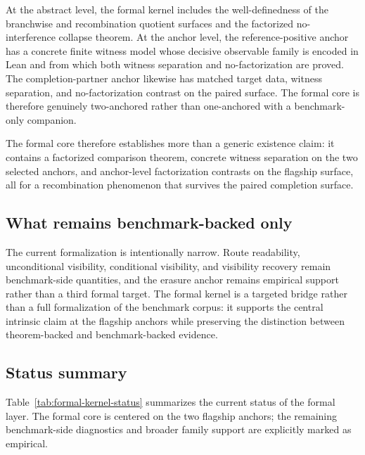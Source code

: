 \documentclass[11pt]{article}
\theoremstyle{definition}
\begin{document}
At the abstract level, the formal kernel includes the well-definedness of the branchwise and recombination quotient surfaces and the factorized no-interference collapse theorem. At the anchor level, the reference-positive anchor has a concrete finite witness model whose decisive observable family is encoded in Lean and from which both witness separation and no-factorization are proved. The completion-partner anchor likewise has matched target data, witness separation, and no-factorization contrast on the paired surface. The formal core is therefore genuinely two-anchored rather than one-anchored with a benchmark-only companion.

The formal core therefore establishes more than a generic existence claim: it contains a factorized comparison theorem, concrete witness separation on the two selected anchors, and anchor-level factorization contrasts on the flagship surface, all for a recombination phenomenon that survives the paired completion surface.

\subsection{What remains benchmark-backed only}

The current formalization is intentionally narrow. Route readability, unconditional visibility, conditional visibility, and visibility recovery remain benchmark-side quantities, and the erasure anchor remains empirical support rather than a third formal target. The formal kernel is a targeted bridge rather than a full formalization of the benchmark corpus: it supports the central intrinsic claim at the flagship anchors while preserving the distinction between theorem-backed and benchmark-backed evidence.

\subsection{Status summary}

Table~\ref{tab:formal-kernel-status} summarizes the current status of the formal layer. The formal core is centered on the two flagship anchors; the remaining benchmark-side diagnostics and broader family support are explicitly marked as empirical.
\end{document}
